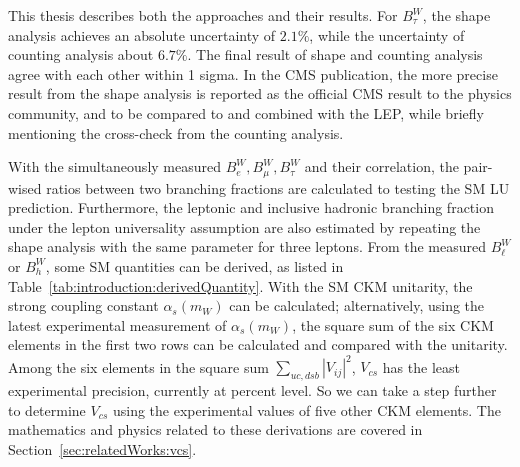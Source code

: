 This thesis describes both the approaches and their results. For $B^W_\tau$, the shape analysis achieves an absolute uncertainty of $2.1\%$, while the uncertainty of counting analysis about $6.7\%$. The final result of shape and counting analysis agree with each other within 1 sigma. In the CMS publication, the more precise result from the shape analysis is reported as the official CMS result to the physics community, and to be compared to and combined with the LEP, while briefly mentioning the cross-check from the counting analysis. 

With the simultaneously measured $B^W_e, B^W_\mu ,B^W_\tau$ and their correlation, the pair-wised ratios between two branching fractions are calculated to testing the SM LU prediction. Furthermore, the leptonic and inclusive hadronic branching fraction under the lepton universality assumption are also estimated by repeating the shape analysis with the same parameter for three leptons. From the measured $B^W_\ell$ or $B^W_h$, some SM quantities can be derived, as listed in Table~\ref{tab:introduction:derivedQuantity}. With the SM CKM unitarity, the strong coupling constant $\alpha_s(m_W)$ can be calculated; alternatively, using the latest experimental measurement of $\alpha_s(m_W)$, the square sum of the six CKM elements in the first two rows can be calculated and compared with the unitarity. Among the six elements in the square sum $\sum_{uc,dsb} |V_{ij}|^2 $, $V_{cs}$ has the least experimental precision, currently at percent level. So we can take a step further to determine $V_{cs}$ using the experimental values of five other CKM elements. The mathematics and physics related to these derivations are covered in Section~\ref{sec:relatedWorks:vcs}.









